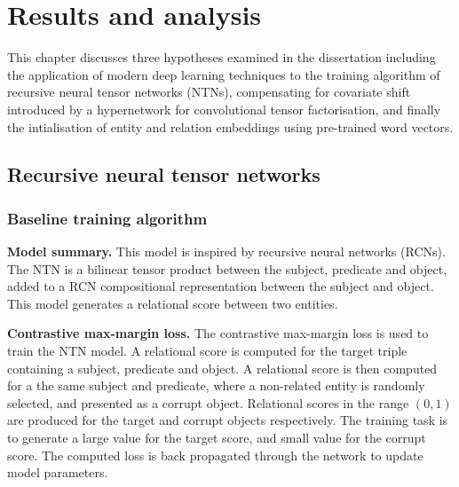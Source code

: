 

\chapter{Results and analysis}  %

\ifpdf
     \graphicspath{{Figs/Chapter4/}}
\else
    \graphicspath{{Chapter4/Figs/Vector/}{Chapter4/Figs/}}
\fi

This chapter discusses three hypotheses examined in the dissertation including the application of modern deep learning techniques to the training algorithm of recursive neural tensor networks (NTNs), compensating for covariate shift introduced by a hypernetwork for convolutional tensor factorisation, and finally the intialisation of entity and relation embeddings using pre-trained word vectors. 



\section{Recursive neural tensor networks}

\subsection{Baseline training algorithm}
\textbf{Model summary.} This model is inspired by recursive neural networks (RCNs). The NTN is a bilinear tensor product between the subject, predicate and object, added to a RCN compositional representation between the subject and object. This model generates a relational score between two entities. 

\noindent \textbf{Contrastive max-margin loss.} The contrastive max-margin loss is used to train the NTN model. A relational score is computed for the target triple containing a subject, predicate and object. A relational score is then computed for a the same subject and predicate, where a non-related entity is randomly selected, and presented as a corrupt object. Relational scores in the range $ (0,1) $ are produced for the target and corrupt objects respectively. The training task is to generate a large value for the target score, and small value for the corrupt score. The computed loss is back propagated through the network to update model parameters. \par


